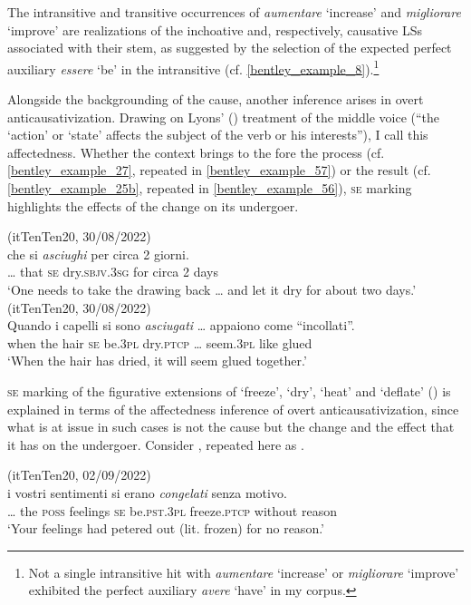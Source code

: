 \documentclass[output=paper,colorlinks,citecolor=brown
]{langscibook}
\begin{document}
The intransitive and transitive occurrences of \textit{aumentare} ‘increase’ and \textit{migliorare} ‘improve’ are realizations of the inchoative and, respectively, causative LSs associated with their stem, as suggested by the selection of the expected perfect auxiliary \textit{essere} ‘be’ in the intransitive (cf. \ref{bentley_example_8}).\footnote{Not a single intransitive hit with \textit{aumentare} ‘increase’ or \textit{migliorare} ‘improve’ exhibited the perfect auxiliary \textit{avere} ‘have’ in my corpus.}

Alongside the backgrounding of the cause, another inference arises in overt anticausativization. Drawing on Lyons’ (\citeyear[373]{lyons1969introduction}) treatment of the middle voice (“the ‘action’ or ‘state’ affects the subject of the verb or his interests”), I call this affectedness. Whether the context brings to the fore the process (cf. \ref{bentley_example_27}, repeated in \ref{bentley_example_57}) or the result (cf. \ref{bentley_example_25b}, repeated in \ref{bentley_example_56}), \textsc{se} marking highlights the effects of the change on its undergoer. 

\ea \label{bentley_example_55}(itTenTen20, 30/08/2022)\\
 che		si		\textit{asciughi}					per		circa	2	giorni. \\
	{\ldots} that	\textsc{se}		dry.\textsc{sbjv}.3\textsc{sg}		for		circa	2	days \\
\glt 			‘One needs to take the drawing back \ldots{}  and let it dry for about two days.’
\ex \label{bentley_example_56} (itTenTen20, 30/08/2022)\\
\gll Quando		i			capelli	si		sono 		\textit{asciugati}  {\ldots}	appaiono		come “incollati”. \\
	when				the	hair			\textsc{se}		be.3\textsc{pl}	dry.\textsc{ptcp}	{\ldots}					seem.3\textsc{pl}		like			glued  \\
\glt 			‘When the hair has dried, it will seem glued together.’
\z

\textsc{se} marking of the figurative extensions of ‘freeze’, ‘dry’, ‘heat’ and ‘deflate’ () is explained in terms of the affectedness inference of overt anticausativization, since what is at issue in such cases is not the cause but the change and the effect that it has on the undergoer. Consider , repeated here as . 

\ea \label{bentley_example_57}(itTenTen20, 02/09/2022)\\
\gll  {\ldots}  i			vostri		sentimenti		si		erano 				\textit{congelati}		senza			motivo.  \\
	{\ldots} 	the	\textsc{poss}			feelings				\textsc{se}		be.\textsc{pst}.3\textsc{pl}	freeze.\textsc{ptcp}	without	reason	 \\
\glt 			‘Your feelings had petered out (lit. frozen) for no reason.’	
\z
\end{document}
